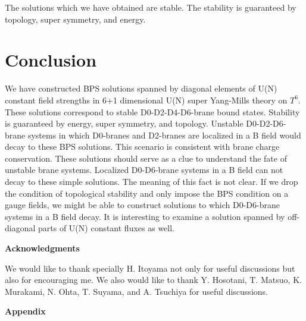 \documentclass[a4paper,12pt]{article}
\begin{document}
 The solutions which we have obtained are stable. The stability is guaranteed by topology, super symmetry, and energy.

\section{Conclusion}
We have constructed BPS solutions spanned by diagonal elements of U(N) constant field strengths in 6+1 dimensional U(N) super Yang-Mills theory on $T^6$. These solutions correspond to stable D0-D2-D4-D6-brane bound states. Stability is guaranteed by energy, super symmetry, and topology. Unstable D0-D2-D6-brane systems in which D0-branes and D2-branes are localized in a B field would decay to these BPS solutions. This scenario is consistent with brane charge conservation. These solutions should serve as a clue to understand the fate of unstable brane systems. Localized D0-D6-brane systems in a B field can not decay to these simple solutions. The meaning of this fact is not clear. If we drop the condition of topological stability and only impose the BPS condition on a gauge fields, we might be able to construct solutions to which D0-D6-brane systems in a B field decay. It is interesting to examine a solution spanned by off-diagonal parts of U(N) constant fluxes as well. 

\vspace{2cm}

\textbf{\large Acknowledgments}

\vspace{5mm}
We would like to thank specially H. Itoyama not only for useful discussions but also for encouraging me. We also would like to thank Y. Hosotani, T. Matsuo, K. Murakami, N. Ohta, T. Suyama, and A. Tsuchiya for useful discussions.

\newpage

\vspace{2cm}

\textbf{\large Appendix}

\vspace{5mm}
\end{document}
